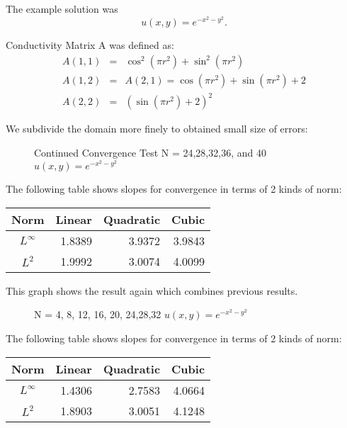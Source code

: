\documentclass[11pt, notitlepage,  letterpaper]{article}
\begin{document}
The example solution was
\begin{equation}
u(x,y) = e^{- x^2 - y^2}.
\end{equation}

Conductivity Matrix A was defined as:
\begin{eqnarray}
    A(1,1) &=& \cos^2(\pi r^2) + \sin^2(\pi r^2)\\
    A(1,2) &=& A(2,1) = \cos(\pi r^2) +  \sin(\pi r^2) + 2\\
    A(2,2) &=& (\sin(\pi r^2)+2)^2
\end{eqnarray}

We subdivide the domain more finely to obtained small size of errors:

\begin{figure}[h]
    \begin{center}
    \caption{\label{scrvsol2}Continued Convergence Test N = 24,28,32,36, and 40 $u(x,y) = e^{- x^2 - y^2}$}
    \end{center}
\end{figure}

The following table shows slopes for convergence in terms of 2 kinds of norm:
\begin{center}
\begin{tabular}{|c||r|r|r|}  \hline
Norm  & Linear & Quadratic & Cubic\\ \hline \hline
$L^{\infty}$&1.8389&3.9372&3.9843 \\\hline
$L^2$&1.9992&3.0074&4.0099\\\hline
\end{tabular}
\end{center}

\newpage
This graph shows the result again which combines previous results.
\begin{figure}[h]
    \begin{center}
    \caption{\label{scrvsol2} N = 4, 8, 12, 16, 20, 24,28,32 $u(x,y) = e^{- x^2 - y^2}$}
    \end{center}
\end{figure}

The following table shows slopes for convergence in terms of 2 kinds of norm:
\begin{center}
\begin{tabular}{|c||r|r|r|}  \hline
Norm  & Linear & Quadratic & Cubic\\ \hline \hline
$L^{\infty}$&1.4306&2.7583&4.0664 \\\hline
$L^2$&1.8903&3.0051&4.1248\\\hline
\end{tabular}
\end{center}
\end{document}
